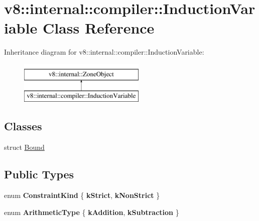 \hypertarget{classv8_1_1internal_1_1compiler_1_1InductionVariable}{}\section{v8\+:\+:internal\+:\+:compiler\+:\+:Induction\+Variable Class Reference}
\label{classv8_1_1internal_1_1compiler_1_1InductionVariable}
Inheritance diagram for v8\+:\+:internal\+:\+:compiler\+:\+:Induction\+Variable\+:\begin{figure}[H]
\begin{center}
\leavevmode
\includegraphics[height=2.000000cm]{classv8_1_1internal_1_1compiler_1_1InductionVariable}
\end{center}
\end{figure}
\subsection*{Classes}
\begin{DoxyCompactItemize}
\item 
struct \mbox{\hyperlink{structv8_1_1internal_1_1compiler_1_1InductionVariable_1_1Bound}{Bound}}
\end{DoxyCompactItemize}
\subsection*{Public Types}
\begin{DoxyCompactItemize}
\item 
\mbox{\label{classv8_1_1internal_1_1compiler_1_1InductionVariable_ace8e308e0bb466d5617de33de219ed24}} 
enum {\bfseries Constraint\+Kind} \{ {\bfseries k\+Strict}, 
{\bfseries k\+Non\+Strict}
 \}
\item 
\mbox{\label{classv8_1_1internal_1_1compiler_1_1InductionVariable_a135b4ec804ac8cf31fdd04ce6393d73a}} 
enum {\bfseries Arithmetic\+Type} \{ {\bfseries k\+Addition}, 
{\bfseries k\+Subtraction}
 \}
\end{DoxyCompactItemize}
